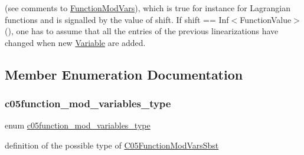 (see comments to \mbox{\hyperlink{class_s_m_spp__di__unipi__it_1_1_function_mod_vars}{Function\+Mod\+Vars}}), which is true for instance for Lagrangian functions and is signalled by the value of shift. If shift == Inf$<$\+Function\+Value$>$(), one has to assume that all the entries of the previous linearizations have changed when new \mbox{\hyperlink{class_s_m_spp__di__unipi__it_1_1_variable}{Variable}} are added. 

\subsection{Member Enumeration Documentation}
\mbox{\label{class_s_m_spp__di__unipi__it_1_1_c05_function_mod_vars_sbst_af44e07bb53595fd1f0385ed3e7fea9ce}} 
\subsubsection{\texorpdfstring{c05function\+\_\+mod\+\_\+variables\+\_\+type}{c05function\_mod\_variables\_type}}
{\footnotesize\ttfamily enum \mbox{\hyperlink{class_s_m_spp__di__unipi__it_1_1_c05_function_mod_vars_sbst_af44e07bb53595fd1f0385ed3e7fea9ce}{c05function\+\_\+mod\+\_\+variables\+\_\+type}}}



definition of the possible type of \mbox{\hyperlink{class_s_m_spp__di__unipi__it_1_1_c05_function_mod_vars_sbst}{C05\+Function\+Mod\+Vars\+Sbst}} 


